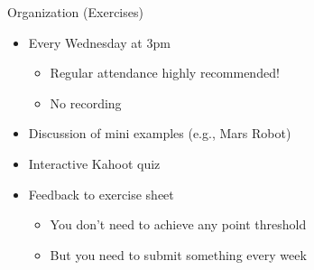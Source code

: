 \documentclass[aspectratio=169]{./latex_main/tntbeamer}  %
\begin{document}
\begin{frame}[c]{Organization (Exercises)}
	
	\begin{itemize}
		\item Every Wednesday at 3pm
		\begin{itemize}
			\item Regular attendance highly recommended!
			\item No recording
		\end{itemize}
		\pause
		\item Discussion of mini examples (e.g., Mars Robot)
		\pause
		\item Interactive Kahoot quiz
		\pause
		\item Feedback to exercise sheet
		\begin{itemize}
			\item You don't need to achieve any point threshold
			\item But you need to submit something every week
		\end{itemize}
	
	\end{itemize}
	
\end{frame}
\end{document}
